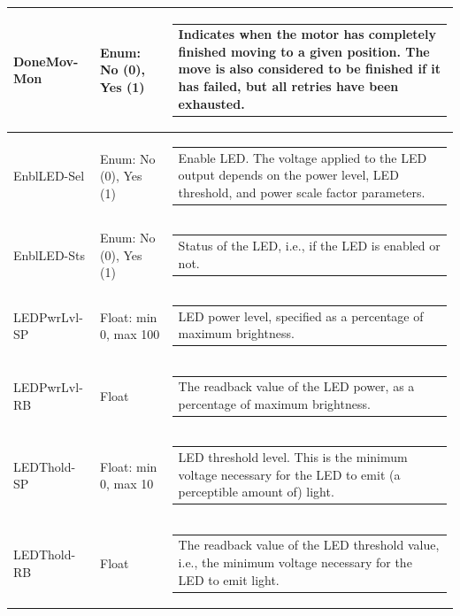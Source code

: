 \documentclass[openany]{article}
\begin{document}
\begin{longtable}{| m{4.5cm} m{2.5cm}  m{7.0cm} |}
        DoneMov-Mon & Enum: No (0), Yes (1) & \begin{tabular}{@{}m{6cm}@{}}
                Indicates when the motor has completely finished moving to a given position. The move is also considered to be finished if it has failed, but all retries have been exhausted.
            \end{tabular} \hypertarget{pv:enbl-led}{}\\ \hline
        EnblLED-Sel & Enum: No (0), Yes (1) & \begin{tabular}{@{}m{6cm}@{}}
                Enable LED. The voltage applied to the LED output depends on the power level, LED threshold, and power scale factor parameters.
            \end{tabular} \hypertarget{}{}\\ \hline
        EnblLED-Sts & Enum: No (0), Yes (1) & \begin{tabular}{@{}m{6cm}@{}}
                Status of the LED, i.e., if the LED is enabled or not.
            \end{tabular} \hypertarget{pv:led-pwr-lvl}{}\\ \hline
        LEDPwrLvl-SP & Float: min 0, max 100 & \begin{tabular}{@{}m{6cm}@{}}
                LED power level, specified as a percentage of maximum brightness.
            \end{tabular} \hypertarget{}{}\\ \hline
        LEDPwrLvl-RB & Float & \begin{tabular}{@{}m{6cm}@{}}
                The readback value of the LED power, as a percentage of maximum brightness.
            \end{tabular} \hypertarget{pv:led-thold}{}\\ \hline
        LEDThold-SP & Float: min 0, max 10 & \begin{tabular}{@{}m{6cm}@{}}
                LED threshold level. This is the minimum voltage necessary for the LED to emit (a perceptible amount of) light.
            \end{tabular} \hypertarget{}{}\\ \hline
        LEDThold-RB & Float & \begin{tabular}{@{}m{6cm}@{}}
                The readback value of the LED threshold value, i.e., the minimum voltage necessary for the LED to emit light.
            \end{tabular} \hypertarget{pv:led-pwr-scale-factor}{}\\ \hline

\end{longtable}
\end{document}
